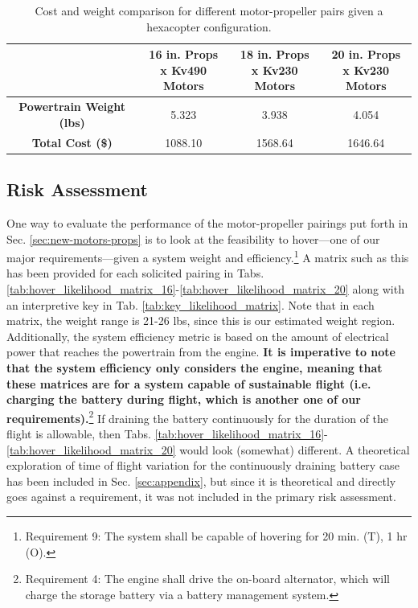 \documentclass{article}
\begin{document}
\begin{table}[h]
    \centering
    \begin{tabular}{|c|c|c|c|}
        \hline
        \rowcolor{lightgray} %
        & \makecell{\textbf{16 in. Props} \\ \textbf{x Kv490 Motors}} & \makecell{\textbf{18 in. Props} \\ \textbf{x Kv230 Motors}} & \makecell{\textbf{20 in. Props} \\ \textbf{x Kv230 Motors}} \\
        \hline
        \textbf{Powertrain Weight (lbs)} & 5.323 & 3.938 & 4.054 \\
        \hline
        \textbf{Total Cost (\$)} & 1088.10 & 1568.64 & 1646.64 \\
        \hline
    \end{tabular}
    \caption{Cost and weight comparison for different motor-propeller pairs given a hexacopter configuration.}
    \label{tab:motor_prop_comparison}
\end{table}

\subsection{Risk Assessment}\label{sec:risk}
One way to evaluate the performance of the motor-propeller pairings put forth in Sec. \ref{sec:new-motors-props} is to look at the feasibility to hover---one of our major requirements---given a system weight and efficiency.\footnote{Requirement 9: The system shall be capable of hovering for 20 min. (T), 1 hr (O).} A matrix such as this has been provided for each solicited pairing in Tabs. \ref{tab:hover_likelihood_matrix_16}-\ref{tab:hover_likelihood_matrix_20} along with an interpretive key in Tab. \ref{tab:key_likelihood_matrix}. Note that in each matrix, the weight range is 21-26 lbs, since this is our estimated weight region. Additionally, the system efficiency metric is based on the amount of electrical power that reaches the powertrain from the engine. \textbf{It is imperative to note that the system efficiency only considers the engine, meaning that these matrices are for a system capable of sustainable flight (i.e. charging the battery during flight, which is another one of our requirements).}\footnote{Requirement 4: The engine shall drive the on-board alternator, which will charge the storage battery via a battery management system.} If draining the battery continuously for the duration of the flight is allowable, then Tabs. \ref{tab:hover_likelihood_matrix_16}-\ref{tab:hover_likelihood_matrix_20} would look (somewhat) different. A theoretical exploration of time of flight variation for the continuously draining battery case has been included in Sec. \ref{sec:appendix}, but since it is theoretical and directly goes against a requirement, it was not included in the primary risk assessment.
\end{document}
